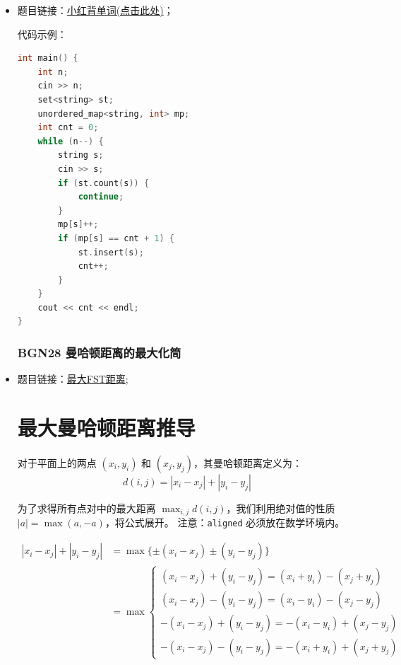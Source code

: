 \begin{itemize}
\subsubsection{BGN26 小红背单词}
\item 题目链接：\href{https://www.nowcoder.com/practice/b3d0fa1c43c44e0580654cb93c1bfdb9?tpId=385&tqId=10626210&sourceUrl=%2Fexam%2Foj%3FquestionJobId%3D10%26subTabName%3Donline_coding_page}{小红背单词(点击此处)}；

代码示例：\\
\begin{lstlisting}[language=C++]
int main() {
	int n;
	cin >> n;
	set<string> st;
	unordered_map<string, int> mp;
	int cnt = 0;
	while (n--) {
		string s;
		cin >> s;
		if (st.count(s)) {
			continue;
		}
		mp[s]++;
		if (mp[s] == cnt + 1) {
			st.insert(s);
			cnt++;
		}
	}
	cout << cnt << endl;
}
\end{lstlisting}
\subsubsection{BGN28 曼哈顿距离的最大化简}
\item 题目链接：\href{https://www.nowcoder.com/practice/6295f81acd1b4fb59c8beed92577f64b?tpId=385&tags=&title=&difficulty=0&judgeStatus=0&rp=0&sourceUrl=%2Fexam%2Foj%3FquestionJobId%3D10%26subTabName%3Donline_coding_page}{最大FST距离};
\section*{最大曼哈顿距离推导}

对于平面上的两点 $(x_i, y_i)$ 和 $(x_j, y_j)$，其曼哈顿距离定义为：
\begin{equation}
	d(i, j) = |x_i - x_j| + |y_i - y_j|
\end{equation}

为了求得所有点对中的最大距离 $\max_{i,j} d(i, j)$，我们利用绝对值的性质 $|a| = \max(a, -a)$，将公式展开。
注意：\texttt{aligned} 必须放在数学环境内。

\begin{equation}
	\begin{aligned}
		|x_i - x_j| + |y_i - y_j| &= \max \{ \pm(x_i - x_j) \pm(y_i - y_j) \} \\
		&= \max \begin{cases} 
			(x_i - x_j) + (y_i - y_j) = (x_i + y_i) - (x_j + y_j) \\
			(x_i - x_j) - (y_i - y_j) = (x_i - y_i) - (x_j - y_j) \\
			-(x_i - x_j) + (y_i - y_j) = -(x_i - y_i) + (x_j - y_j) \\
			-(x_i - x_j) - (y_i - y_j) = -(x_i + y_i) + (x_j + y_j)
		\end{cases}
	\end{aligned}
\end{equation}


\end{itemize}
